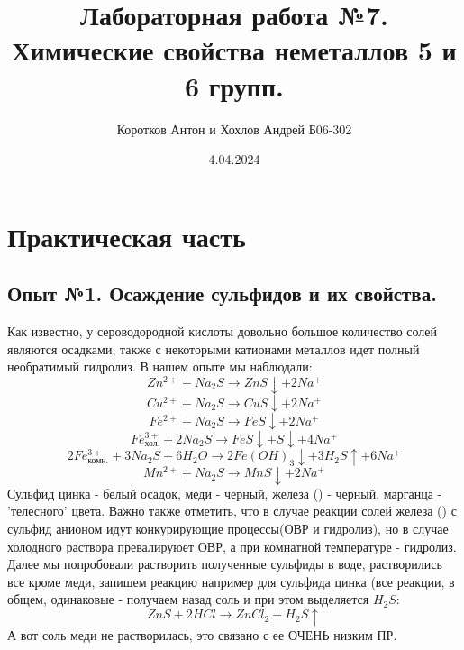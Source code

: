 \documentclass[a4paper,12pt]{article}
\title{\textbf{Лабораторная работа №7. Химические свойства неметаллов 5 и 6 групп.}}
\author{Коротков Антон и Хохлов Андрей Б06-302 }
\date{4.04.2024}
\newcommand{\RomanNumeralCaps}[1]
    {\MakeUppercase{\romannumeral #1}}
\begin{document}
	
	\maketitle


\section{Практическая часть}
\subsection{Опыт №1. Осаждение сульфидов и их свойства.}
Как известно, у сероводородной кислоты довольно большое количество солей являются осадками, также с некоторыми катионами металлов идет полный необратимый гидролиз. В нашем опыте мы наблюдали:
\begin{equation}
    Zn^{2+} + Na_2S \xrightarrow[]{} ZnS \downarrow + 2Na^+
\end{equation}
\begin{equation}
    Cu^{2+} + Na_2S \xrightarrow{} CuS\downarrow + 2Na^+
\end{equation}
\begin{equation}
    Fe^{2+}+ Na_2S \xrightarrow{} FeS\downarrow + 2Na^+
\end{equation}
\begin{equation}
    Fe^{3+}_{\text{хол.}} + 2Na_2S \xrightarrow{} FeS\downarrow + S\downarrow + 4Na^+
\end{equation}
\begin{equation}
    2Fe^{3+}_{\text{комн.}} + 3Na_2S  + 6H_2O\xrightarrow{} 2Fe(OH)_3\downarrow + 3H_2S\uparrow + 6Na^+
\end{equation}
\begin{equation}
    Mn^{2+} + Na_2S \xrightarrow[]{} MnS\downarrow + 2Na^+
\end{equation}
Сульфид цинка - белый осадок, меди - черный, железа (\RomanNumeralCaps{2}) - черный, марганца - 'телесного' цвета. Важно также отметить, что в случае реакции солей железа (\RomanNumeralCaps{3}) с сульфид анионом идут конкурирующие процессы(ОВР и гидролиз), но в случае холодного раствора превалируюет ОВР, а при комнатной температуре - гидролиз. Далее мы попробовали растворить полученные сульфиды в воде, растворились все кроме меди, запишем реакцию например для сульфида цинка (все реакции, в общем, одинаковые - получаем назад соль и при этом выделяется $H_2S$:
\begin{equation}
  ZnS + 2HCl \xrightarrow[]{} ZnCl_2 + H_2S\uparrow  
\end{equation}
А вот соль меди не растворилась, это связано с ее ОЧЕНЬ низким ПР.
\end{document}
